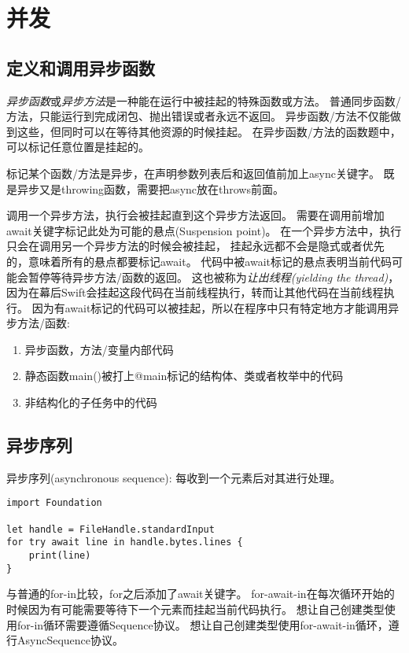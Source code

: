 \documentclass{../main.tex}{subfiles}
\begin{document}
\section{并发}
\subsection{定义和调用异步函数}
\emph{异步函数}或\emph{异步方法}是一种能在运行中被挂起的特殊函数或方法。
普通同步函数/方法，只能运行到完成闭包、抛出错误或者永远不返回。
异步函数/方法不仅能做到这些，但同时可以在等待其他资源的时候挂起。
在异步函数/方法的函数题中，可以标记任意位置是挂起的。

标记某个函数/方法是异步，在声明参数列表后和返回值前加上async关键字。
既是异步又是throwing函数，需要把async放在throws前面。

调用一个异步方法，执行会被挂起直到这个异步方法返回。
需要在调用前增加await关键字标记此处为可能的悬点(Suspension point)。
在一个异步方法中，执行只会在调用另一个异步方法的时候会被挂起，
挂起永远都不会是隐式或者优先的，意味着所有的悬点都要标记await。
代码中被await标记的悬点表明当前代码可能会暂停等待异步方法/函数的返回。
这也被称为\emph{让出线程(yielding the thread)}，
因为在幕后Swift会挂起这段代码在当前线程执行，转而让其他代码在当前线程执行。
因为有await标记的代码可以被挂起，所以在程序中只有特定地方才能调用异步方法/函数:
\begin{enumerate}[itemsep=0pt, parsep=0pt, topsep=0pt, partopsep=0pt]
  \item 异步函数，方法/变量内部代码
  \item 静态函数main()被打上@main标记的结构体、类或者枚举中的代码
  \item 非结构化的子任务中的代码
\end{enumerate}
\subsection{异步序列}
异步序列(asynchronous sequence): 每收到一个元素后对其进行处理。
\begin{lstlisting}[style = lstCodeStyleSwift, caption = {异步序列}]
import Foundation

let handle = FileHandle.standardInput
for try await line in handle.bytes.lines {
    print(line)
}
\end{lstlisting}
与普通的for-in比较，for之后添加了await关键字。
for-await-in在每次循环开始的时候因为有可能需要等待下一个元素而挂起当前代码执行。
想让自己创建类型使用for-in循环需要遵循Sequence协议。
想让自己创建类型使用for-await-in循环，遵行AsyncSequence协议。
\end{document}
